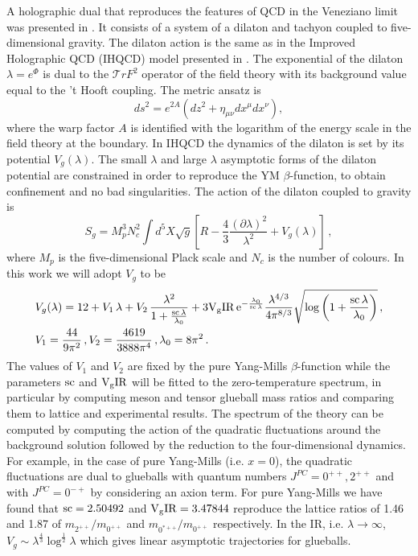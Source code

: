 \documentclass[a4paper,12pt]{article}
\begin{document}
A holographic dual that reproduces the features of QCD in the Veneziano limit was presented in \cite{Jarvinen:2011qe}. It consists of a system of a dilaton and tachyon coupled to five-dimensional gravity. The dilaton action is the same as in the Improved Holographic QCD (IHQCD) model presented in \cite{gursoy_exploring_2008, gursoy_exploring_2008-1}. The exponential of the dilaton $\lambda = e^\Phi$ is dual to the $\mathcal{T}r F^2$ operator of the field theory with its background value equal to the 't Hooft coupling.
The metric ansatz is
\begin{equation}
\label{eq: metric definition}
ds^2 = e^{2 A} \left( d z^2 + \eta_{\mu \nu} dx^\mu dx^\nu \right),
\end{equation}
where the warp factor $A$ is identified with the logarithm of the energy scale in the field theory at the boundary.
In IHQCD the dynamics of the dilaton is set by its potential $V_g(\lambda)$. The small $\lambda$ and large $\lambda$ asymptotic forms of the dilaton potential are constrained in order to reproduce the YM $\beta$-function, to obtain confinement and no bad singularities.
The action of the dilaton coupled to gravity is
\begin{equation}
S_g =  M_p^3 N_c^2 \int d^5X \sqrt{g} \left[ R - \frac{4}{3} \frac{{\left( \partial \lambda \right)}^2}{\lambda^2}+ V_g \left( \lambda\right) \right]\, ,
\label{eq:sg_action}
\end{equation}
where $M_p$ is the five-dimensional Plack scale and $N_c$ is the number of colours.
In this work we will adopt $V_g$ to be
\begin{align}
&V_g(\lambda) = 12 + V_1 \, \lambda + V_2 \, \frac{\lambda^2}{1 + \frac{\rm{sc} \, \lambda}{\lambda_0}} + 3 \rm{V_gIR} \, e^{-\frac{\lambda_0}{\rm {sc} \, \lambda}}  \frac{\lambda^{4/3}}{4 \pi^{8/3}}\sqrt{\log\left(1+\frac{\rm{sc} \, \lambda}{\lambda_0}\right)} \, , \\ \notag
& V_1 = \frac{44}{9 \pi^2} \, , V_2 = \frac{4619}{3888 \pi^4} \, , \lambda_0 = 8 \pi^2 \, .
\end{align}
The values of $V_1$ and $V_2$ are fixed by the pure Yang-Mills $\beta$-function while the parameters $\rm{sc}$ and $\rm{V_gIR}$ will be fitted to the zero-temperature spectrum, in particular by computing meson and tensor glueball mass ratios and comparing them to lattice and experimental results. The spectrum of the theory can be computed by computing the action of the quadratic fluctuations around the background solution followed by the reduction to the four-dimensional dynamics. For example, in the case of pure Yang-Mills (i.e. $x = 0$), the quadratic fluctuations are dual to glueballs with quantum numbers $J^{PC} = 0^{++}, 2^{++}$ and with $J^{PC} = 0^{-+}$ by considering an axion term. For pure Yang-Mills  we have found that $\rm{sc} = 2.50492$ and   $\rm{V_gIR} = 3.47844$ reproduce the lattice ratios of 1.46 and 1.87 of $m_{2^{++}} / m_{0^{++}}$ and $m_{0^{*++}} / m_{0^{++}}$ respectively. In the IR, i.e. $\lambda \rightarrow \infty$, $V_g \sim \lambda^{\frac{4}{3}} \log^{\frac{1}{2}} \lambda$ which gives  linear asymptotic trajectories for glueballs.
\end{document}
